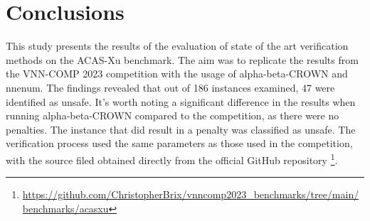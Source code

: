 \section{Conclusions}
\label{chap:ch5}

This study presents the results of the evaluation of state of the art verification methods on the ACAS-Xu benchmark. The aim was to replicate the results from the VNN-COMP 2023\cite{brix2023fourth}  competition with the usage of alpha-beta-CROWN and nnenum. The findings revealed that out of 186 instances examined, 47 were identified as unsafe. It's worth noting a significant difference in the results when running alpha-beta-CROWN compared to the competition, as there were no penalties. The instance that did result in a penalty was classified as unsafe. The verification process used the same parameters as those used in the competition, with the source filed obtained directly from the official GitHub repository \footnote{\url{https://github.com/ChristopherBrix/vnncomp2023_benchmarks/tree/main/benchmarks/acasxu}}.